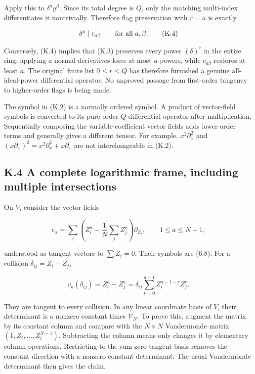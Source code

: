 \documentclass[a4paper,11pt]{article}
\numberwithin{equation}{section}
\begin{document}
Apply this to \(\delta^ay^\beta\). Since its total degree is \(Q\), only the matching multi-index differentiates it nontrivially. Therefore flag preservation with \(r=a\) is exactly

\[
\delta^a\mid c_{a\beta}\qquad\hbox{for all }a,\beta.
\tag{K.4}
\]

Conversely, (K.4) implies that (K.3) preserves every power \((\delta)^r\) in the entire ring: applying \(a\) normal derivatives loses at most \(a\) powers, while \(c_{a\beta}\) restores at least \(a\). The original finite list \(0\le r\le Q\) has therefore furnished a genuine all-ideal-power differential operator. No unproved passage from first-order tangency to higher-order flags is being made.

The symbol in (K.2) is a normally ordered symbol. A product of vector-field symbols is converted to its pure order-\(Q\) differential operator after multiplication. Sequentially composing the variable-coefficient vector fields adds lower-order terms and generally gives a different tensor. For example, \(x^2\partial_x^2\) and \((x\partial_x)^2=x^2\partial_x^2+x\partial_x\) are not interchangeable in (K.2).

\hypertarget{k.4-a-complete-logarithmic-frame-including-multiple-intersections}{%
\subsection{K.4 A complete logarithmic frame, including multiple intersections}\label{k.4-a-complete-logarithmic-frame-including-multiple-intersections}}

On \(V\), consider the vector fields

\[
v_a=\sum_i\left(Z_i^a-\frac1N\sum_jZ_j^a\right)\partial_{Z_i},
\qquad 1\le a\le N-1,
\tag{K.5}
\]

understood as tangent vectors to \(\sum Z_i=0\). Their symbols are (6.8). For a collision \(\delta_{ij}=Z_i-Z_j\),

\[
v_a(\delta_{ij})=Z_i^a-Z_j^a
=\delta_{ij}\sum_{r=0}^{a-1}Z_i^{a-1-r}Z_j^r.
\tag{K.6}
\]

They are tangent to every collision. In any linear coordinate basis of \(V\), their determinant is a nonzero constant times \(\mathcal V_N\). To prove this, augment the matrix by its constant column and compare with the \(N\times N\) Vandermonde matrix \((1,Z_i,\ldots,Z_i^{N-1})\). Subtracting the column means only changes it by elementary column operations. Restricting to the sum-zero tangent basis removes the constant direction with a nonzero constant determinant. The usual Vandermonde determinant then gives the claim.
\end{document}
